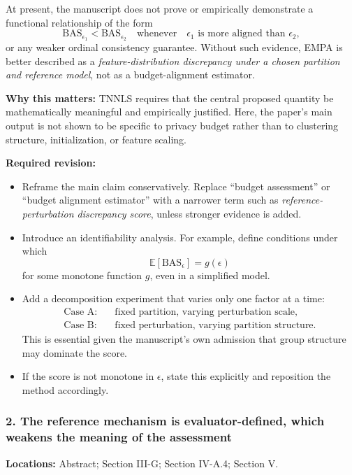 At present, the manuscript does not prove or empirically demonstrate a functional relationship of the form
\begin{equation}
\mathrm{BAS}_{\epsilon_1} < \mathrm{BAS}_{\epsilon_2}
\quad \text{whenever} \quad
\epsilon_1 \text{ is more aligned than } \epsilon_2,
\end{equation}
or any weaker ordinal consistency guarantee. Without such evidence, EMPA is better described as a \emph{feature-distribution discrepancy under a chosen partition and reference model}, not as a budget-alignment estimator.

\textbf{Why this matters:} TNNLS requires that the central proposed quantity be mathematically meaningful and empirically justified. Here, the paper's main output is not shown to be specific to privacy budget rather than to clustering structure, initialization, or feature scaling.

\textbf{Required revision:}
\begin{itemize}
    \item Reframe the main claim conservatively. Replace ``budget assessment'' or ``budget alignment estimator'' with a narrower term such as \emph{reference-perturbation discrepancy score}, unless stronger evidence is added.
    \item Introduce an identifiability analysis. For example, define conditions under which
    \begin{equation}
    \mathbb{E}\!\left[\mathrm{BAS}_{\epsilon}\right] = g(\epsilon)
    \end{equation}
    for some monotone function $g$, even in a simplified model.
    \item Add a decomposition experiment that varies only one factor at a time:
    \begin{align}
    \text{Case A:} &\quad \text{fixed partition, varying perturbation scale}, \\
    \text{Case B:} &\quad \text{fixed perturbation, varying partition structure}.
    \end{align}
    This is essential given the manuscript's own admission that group structure may dominate the score.
    \item If the score is not monotone in $\epsilon$, state this explicitly and reposition the method accordingly.
\end{itemize}

\subsubsection*{2. The reference mechanism is evaluator-defined, which weakens the meaning of the assessment}
\textbf{Locations:} Abstract; Section III-G; Section IV-A.4; Section V.

